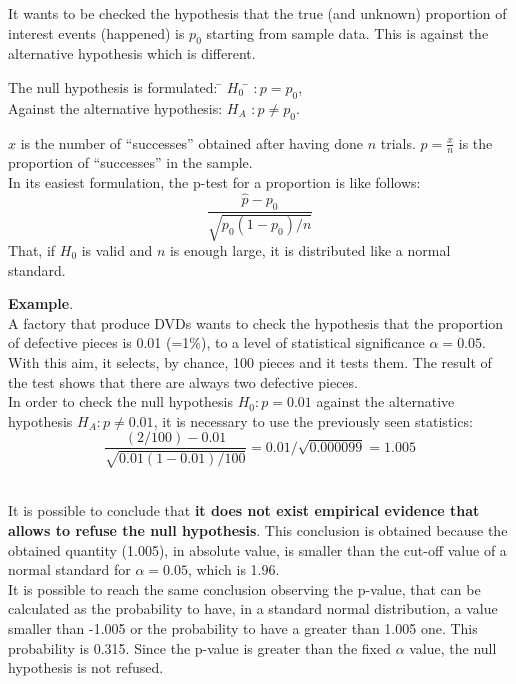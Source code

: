 \begin{frame}
  It wants to be checked the hypothesis that the true (and unknown) proportion of interest events (happened) is $ p_0 $ starting from sample data. This is against the alternative hypothesis which is different.\\
  \begin{tabbing}
    The null hypothesis is formulated: \=  $ H_0 $ \= $ :  p = p_0 $,\\
    Against the alternative hypothesis: \>  $ H_A $ \> $ :  p \neq p_0 $.\\
  \end{tabbing}
  \vspace{-0.5cm} 
  $ {x} $ is the number of ``successes'' obtained after having done $ n $ trials. $ \hat{p} = \frac{x}{n} $ is the proportion of ``successes'' in the sample.\\
  In its easiest formulation, the p-test for a proportion is like follows:
  $$ \frac{\hat{p} - p_0}{\sqrt{p_0 (1-p_0) / n}} $$
  That, if $ H_0 $  is valid and $ n $ is enough large, it is distributed like a normal standard.
\end{frame}

\begin{frame}
  \vspace*{.25cm}
  \textbf{Example}.\\
  \vspace{0.25cm}
  A factory that produce DVDs wants to check the hypothesis that the proportion of defective pieces is 0.01 (=1$ \% $), to a level of statistical significance $ \alpha = 0.05 $.\\
  \vspace{0.25cm}
  With this aim, it selects, by chance, 100 pieces and it tests them. The result of the test shows that there are always two defective pieces.\\
  \vspace{0.25cm}
  In order to check the null hypothesis $ H_0: p = 0.01 $ against the alternative hypothesis $ H_A: p \neq 0.01 $, it is necessary to use the previously seen statistics:
  $$ \frac{(2/100) - 0.01}{\sqrt{0.01 (1-0.01) / 100}} = 0.01 / \sqrt{0.000099} = 1.005 $$\
\end{frame}

\begin{frame}
  \vspace{0.25cm}
  It is possible to conclude that \textbf{ it does not exist empirical evidence that allows to refuse the null hypothesis}. This conclusion is obtained because the obtained quantity (1.005), in absolute value, is smaller than the cut-off value of a normal standard for $ \alpha = 0.05 $, which is 1.96.\\ 
  \vspace{0.5cm}
  It is possible to reach the same conclusion observing the p-value, that can be calculated as the probability to have, in a standard normal distribution, a value smaller than -1.005 or the probability to have a greater than 1.005 one. This probability is 0.315. Since the p-value is greater than the fixed $ \alpha $ value, the null hypothesis is not refused.
\end{frame}

